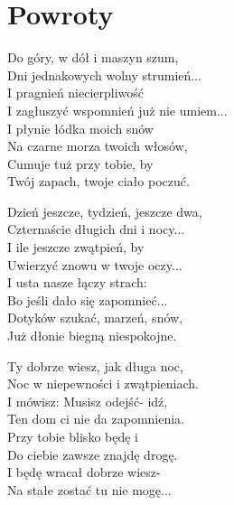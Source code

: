 \section{Powroty}
\begin{text}
Do góry, w dół i maszyn szum,\\
Dni jednakowych wolny strumień...\\
I pragnień niecierpliwość\\
I zagłuszyć wspomnień już nie umiem...\\
\vin I płynie łódka moich snów\\
\vin Na czarne morza twoich włosów,\\
\vin Cumuje tuż przy tobie, by\\
\vin Twój zapach, twoje ciało poczuć. 

Dzień jeszcze, tydzień, jeszcze dwa,\\
Czternaście długich dni i nocy...\\
I ile jeszcze zwątpień, by\\
Uwierzyć znowu w twoje oczy...\\
\vin I usta nasze łączy strach:\\
\vin Bo jeśli dało się zapomnieć...\\
\vin Dotyków szukać, marzeń, snów,\\
\vin Już dłonie biegną niespokojne.

Ty dobrze wiesz, jak długa noc,\\
Noc w niepewności i zwątpieniach.\\
I mówisz: Musisz odejść- idź,\\
Ten dom ci nie da zapomnienia.\\
\vin Przy tobie blisko będę i\\
\vin Do ciebie zawsze znajdę drogę.\\
\vin I będę wracał dobrze wiesz-\\
\vin Na stałe zostać tu nie mogę...
\end{text}